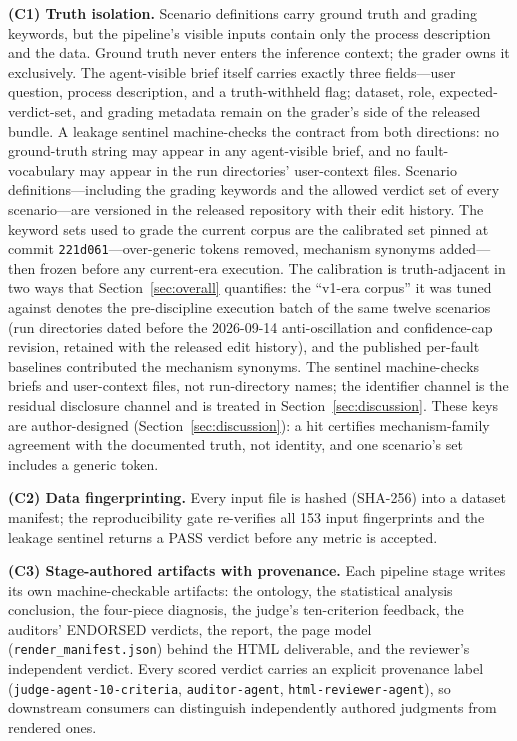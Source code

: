 \documentclass[preprint,12pt]{elsarticle}
\begin{document}
\textbf{(C1) Truth isolation.} Scenario definitions carry ground truth and grading keywords, but the pipeline's visible inputs contain only the process description and the data. Ground truth never enters the inference context; the grader owns it exclusively. The agent-visible brief itself carries exactly three fields---user question, process description, and a truth-withheld flag; dataset, role, expected-verdict-set, and grading metadata remain on the grader's side of the released bundle. A leakage sentinel machine-checks the contract from both directions: no ground-truth string may appear in any agent-visible brief, and no fault-vocabulary may appear in the run directories' user-context files. Scenario definitions---including the grading keywords and the allowed verdict set of every scenario---are versioned in the released repository with their edit history. The keyword sets used to grade the current corpus are the calibrated set pinned at commit \texttt{221d061}---over-generic tokens removed, mechanism synonyms added---then frozen before any current-era execution. The calibration is truth-adjacent in two ways that Section~\ref{sec:overall} quantifies: the ``v1-era corpus'' it was tuned against denotes the pre-discipline execution batch of the same twelve scenarios (run directories dated before the 2026-09-14 anti-oscillation and confidence-cap revision, retained with the released edit history), and the published per-fault baselines contributed the mechanism synonyms. The sentinel machine-checks briefs and user-context files, not run-directory names; the identifier channel is the residual disclosure channel and is treated in Section~\ref{sec:discussion}. These keys are author-designed (Section~\ref{sec:discussion}): a hit certifies mechanism-family agreement with the documented truth, not identity, and one scenario's set includes a generic token.

\textbf{(C2) Data fingerprinting.} Every input file is hashed (SHA-256) into a dataset manifest; the reproducibility gate re-verifies all 153 input fingerprints and the leakage sentinel returns a PASS verdict before any metric is accepted.

\textbf{(C3) Stage-authored artifacts with provenance.} Each pipeline stage writes its own machine-checkable artifacts: the ontology, the statistical analysis conclusion, the four-piece diagnosis, the judge's ten-criterion feedback, the auditors' ENDORSED verdicts, the report, the page model (\texttt{render\_manifest.json}) behind the HTML deliverable, and the reviewer's independent verdict. Every scored verdict carries an explicit provenance label (\texttt{judge-agent-10-criteria}, \texttt{auditor-agent}, \texttt{html-reviewer-agent}), so downstream consumers can distinguish independently authored judgments from rendered ones.
\end{document}
